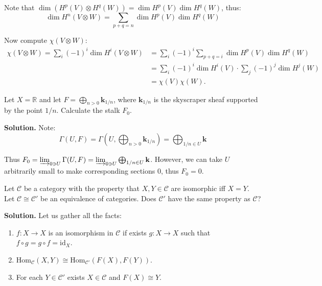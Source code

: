 \documentclass{category-template}
\begin{document}
Note that $\dim(H^p(V) \otimes H^q(W)) = \dim H^p(V) \dim H^q(W)$, thus:
\begin{equation*}
    \dim H^n(V \otimes W) = \sum_{p+q=n}\dim H^p(V) \dim H^q(W)
\end{equation*}

Now compute $\chi(V \otimes W)$:
\begin{align*}
    \chi(V \otimes W) = \sum_i (-1)^i\dim H^i(V \otimes W) &= \sum_i (-1)^i\sum_{p+q=i}\dim H^p(V) \dim H^q(W)\\
    &= \sum_i (-1)^i\dim H^i(V) \cdot \sum_j (-1)^j\dim H^j(W) \\
    &= \chi(V)\chi(W).
\end{align*}

\begin{problem}
    Let $X=\mathbb{R}$ and let $F = \bigoplus_{n>0}\mathbf{k}_{1/n}$, where
    $\mathbf{k}_{1/n}$ is the skyscraper sheaf supported by the point $1/n$.
    Calculate the stalk $F_0$.
\end{problem}

\textbf{Solution.} Note:
\begin{equation*}
    \Gamma(U, F) = \Gamma\left(U,\bigoplus_{n>0}\mathbf{k}_{1/n}\right) = \bigoplus_{1/n \in U}\mathbf{k}
\end{equation*}

Thus $F_0 = \varinjlim_{0 \ni U}\Gamma(U, F) = \varinjlim_{0 \ni
U}\bigoplus_{1/n \in U}\mathbf{k}$. However, we can take $U$ arbitrarily small
to make corresponding sections $0$, thus $F_0=0$.

\begin{problem}
    Let $\mathcal{C}$ be a category with the property that $X,Y \in \mathcal{C}$
    are isomorphic iff $X=Y$. Let $\mathcal{C} \cong \mathcal{C}'$ be an equivalence 
    of categories. Does $\mathcal{C}'$ have the same property as $\mathcal{C}$?
\end{problem}

\textbf{Solution.} Let us gather all the facts:
\begin{enumerate}
    \item $f: X \to X$ is an isomorphism in $\mathcal{C}$ if
exists $g: X \to X$ such that $f\circ g = g\circ f = \text{id}_X$.
    \item $\text{Hom}_{\mathcal{C}}(X,Y) \cong \text{Hom}_{\mathcal{C}'}(F(X), F(Y))$.
    \item For each $Y \in \mathcal{C}'$ exists $X \in \mathcal{C}$ and $F(X)
    \cong Y$.
\end{enumerate}
\end{document}
